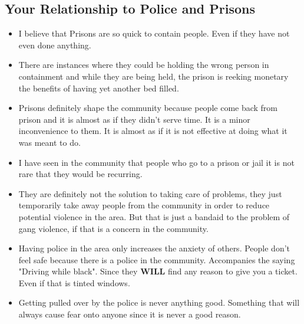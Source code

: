 \documentclass{article}
\begin{document}
\subsection{Your Relationship to Police and Prisons}
\begin{itemize}
  \item I believe that Prisons are so quick to contain people. Even
    if they have not even done anything.
  \item There are instances where they could be holding the wrong person
    in containment and while they are being held,
    the prison is reeking monetary the benefits of having yet another bed filled.
  \item Prisons definitely shape the community because people come back from prison
 and it is almost as if they didn't serve time. It is a minor inconvenience to them.
 It is almost as if it is not effective at doing what it was meant to do.
\item I have seen in the community that people who go to a prison or jail
  it is not rare that they would be recurring.
\item They are definitely not the solution to taking care of problems, they just
  temporarily take away people from the community in order to reduce potential violence
  in the area. But that is just a bandaid to the problem of gang violence, if that
  is a concern in the community.
\item Having police in the area only increases the anxiety of others.
  People don't feel safe because there is a police in the community.
  Accompanies the saying "Driving while black". Since they \textbf{WILL}
  find any reason to give you a ticket. Even if that is tinted windows.
\item Getting pulled over by the police is never anything good. Something that
  will always cause fear onto anyone since it is never a good reason.
\end{itemize}
\end{document}
